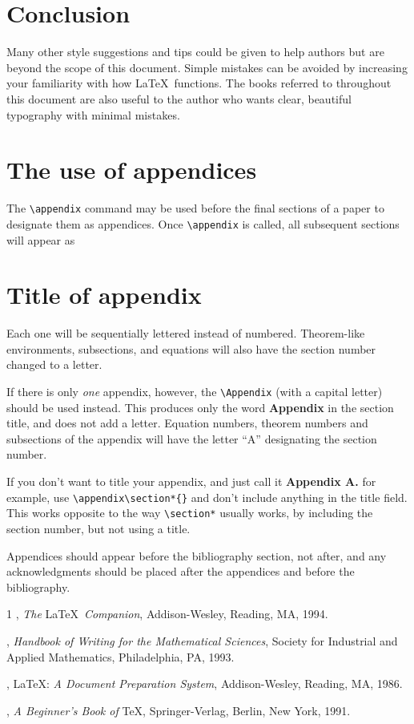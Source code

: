 \documentclass[]{article}
\begin{document}
\section{Conclusion}\label{conclusion}

Many other style suggestions and tips could be given to help authors but
are beyond the scope of this document. Simple mistakes can be avoided by
increasing your familiarity with how LaTeX~functions. The books referred
to throughout this document are also useful to the author who wants
clear, beautiful typography with minimal mistakes.

\section{The use of appendices}\label{the-use-of-appendices}

The \texttt{\textbackslash{}appendix} command may be used before the
final sections of a paper to designate them as appendices. Once
\texttt{\textbackslash{}appendix} is called, all subsequent sections
will appear as

\section{Title of appendix}\label{title-of-appendix}

Each one will be sequentially lettered instead of numbered. Theorem-like
environments, subsections, and equations will also have the section
number changed to a letter.

If there is only {\emph{one}} appendix, however, the
\texttt{\textbackslash{}Appendix} (with a capital letter) should be used
instead. This produces only the word {\textbf{Appendix}} in the section
title, and does not add a letter. Equation numbers, theorem numbers and
subsections of the appendix will have the letter ``A'' designating the
section number.

If you don't want to title your appendix, and just call it
{\textbf{Appendix A.}} for example, use
\texttt{\textbackslash{}appendix\textbackslash{}section*\{\}} and don't
include anything in the title field. This works opposite to the way
\texttt{\textbackslash{}section*} usually works, by including the
section number, but not using a title.

Appendices should appear before the bibliography section, not after, and
any acknowledgments should be placed after the appendices and before the
bibliography.

{1} , {\emph{The}} LaTeX~{\emph{Companion}}, Addison-Wesley, Reading,
MA, 1994.

, {\emph{Handbook of Writing for the Mathematical Sciences}}, Society
for Industrial and Applied Mathematics, Philadelphia, PA, 1993.

, LaTeX: {\emph{A Document Preparation System}}, Addison-Wesley,
Reading, MA, 1986.

, {\emph{A Beginner's Book of}} TeX, Springer-Verlag, Berlin, New York,
1991.
\end{document}
